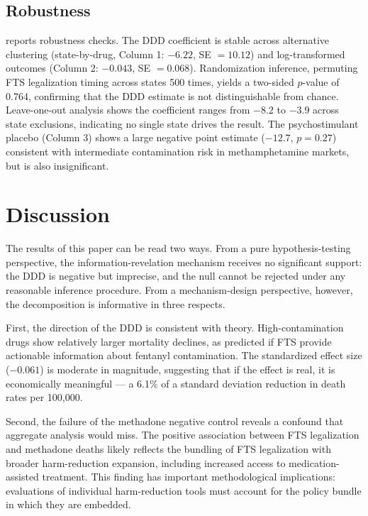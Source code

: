 \documentclass[12pt]{article}
\begin{document}
\subsection{Robustness}



 reports robustness checks. The DDD coefficient is stable across alternative clustering (state-by-drug, Column 1: $-6.22$, SE $= 10.12$) and log-transformed outcomes (Column 2: $-0.043$, SE $= 0.068$). Randomization inference, permuting FTS legalization timing across states 500 times, yields a two-sided $p$-value of 0.764, confirming that the DDD estimate is not distinguishable from chance. Leave-one-out analysis shows the coefficient ranges from $-8.2$ to $-3.9$ across state exclusions, indicating no single state drives the result. The psychostimulant placebo (Column 3) shows a large negative point estimate ($-12.7$, $p = 0.27$) consistent with intermediate contamination risk in methamphetamine markets, but is also insignificant.

\section{Discussion}

The results of this paper can be read two ways. From a pure hypothesis-testing perspective, the information-revelation mechanism receives no significant support: the DDD is negative but imprecise, and the null cannot be rejected under any reasonable inference procedure. From a mechanism-design perspective, however, the decomposition is informative in three respects.

First, the direction of the DDD is consistent with theory. High-contamination drugs show relatively larger mortality declines, as predicted if FTS provide actionable information about fentanyl contamination. The standardized effect size ($-0.061$) is moderate in magnitude, suggesting that if the effect is real, it is economically meaningful --- a 6.1\% of a standard deviation reduction in death rates per 100,000.

Second, the failure of the methadone negative control reveals a confound that aggregate analysis would miss. The positive association between FTS legalization and methadone deaths likely reflects the bundling of FTS legalization with broader harm-reduction expansion, including increased access to medication-assisted treatment. This finding has important methodological implications: evaluations of individual harm-reduction tools must account for the policy bundle in which they are embedded.
\end{document}
